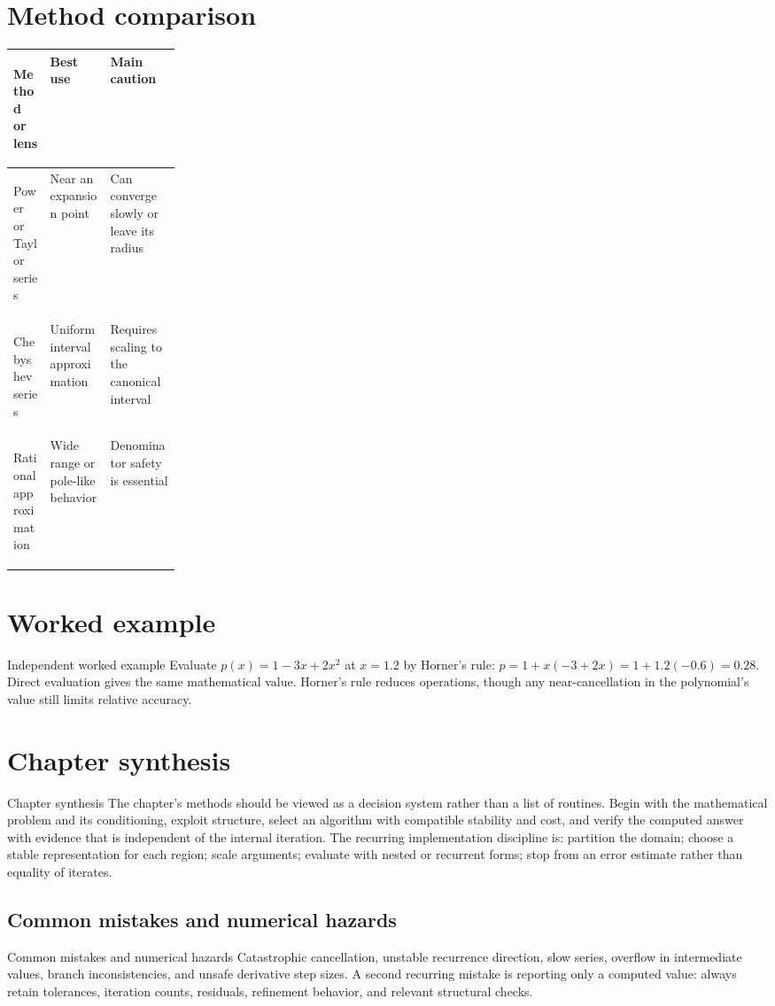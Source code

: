 \documentclass[10pt,letterpaper]{article}
\begin{document}
\section*{Method comparison}
\begin{center}
\small
\begin{tabularx}{\linewidth}{>{\bfseries\raggedright\arraybackslash}p{0.22\linewidth}XX}
\toprule
Method or lens & Best use & Main caution \\
\midrule
Power or Taylor series & Near an expansion point & Can converge slowly or leave its radius \\
Chebyshev series & Uniform interval approximation & Requires scaling to the canonical interval \\
Rational approximation & Wide range or pole-like behavior & Denominator safety is essential \\
\bottomrule
\end{tabularx}
\end{center}

\section*{Worked example}
\begin{exambox}{Independent worked example}
Evaluate $p(x)=1-3x+2x^2$ at $x=1.2$ by Horner's rule: $p=1+x(-3+2x)=1+1.2(-0.6)=0.28$.  Direct evaluation gives the same mathematical value.  Horner's rule reduces operations, though any near-cancellation in the polynomial's value still limits relative accuracy.
\end{exambox}

\section*{Chapter synthesis}
\begin{summarybox}{Chapter synthesis}
The chapter's methods should be viewed as a decision system rather than a list of routines.  Begin with the mathematical problem and its conditioning, exploit structure, select an algorithm with compatible stability and cost, and verify the computed answer with evidence that is independent of the internal iteration.  The recurring implementation discipline is: partition the domain; choose a stable representation for each region; scale arguments; evaluate with nested or recurrent forms; stop from an error estimate rather than equality of iterates.
\end{summarybox}

\subsection*{Common mistakes and numerical hazards}
\begin{warnbox}{Common mistakes and numerical hazards}
Catastrophic cancellation, unstable recurrence direction, slow series, overflow in intermediate values, branch inconsistencies, and unsafe derivative step sizes.  A second recurring mistake is reporting only a computed value: always retain tolerances, iteration counts, residuals, refinement behavior, and relevant structural checks.
\end{warnbox}
\end{document}
